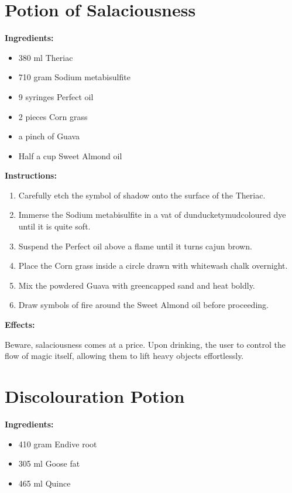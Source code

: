 \documentclass{article}
\begin{document}
\newpage
\section*{Potion of Salaciousness}

\textbf{Ingredients:}

\begin{itemize}
  \item 380 ml Theriac
  \item 710 gram Sodium metabisulfite
  \item 9 syringes Perfect oil
  \item 2 pieces Corn grass
  \item a pinch of Guava
  \item Half a cup Sweet Almond oil
\end{itemize}

\textbf{Instructions:}

\begin{enumerate}
  \item Carefully etch the symbol of shadow onto the surface of the Theriac.
  \item Immerse the Sodium metabisulfite in a vat of dunducketymudcoloured dye until it is quite soft.
  \item Suspend the Perfect oil above a flame until it turns cajun brown.
  \item Place the Corn grass inside a circle drawn with whitewash chalk overnight.
  \item Mix the powdered Guava with greencapped sand and heat boldly.
  \item Draw symbols of fire around the Sweet Almond oil before proceeding.
\end{enumerate}

\textbf{Effects:}

Beware, salaciousness comes at a price. Upon drinking, the user to control the flow of magic itself, allowing them to lift heavy objects effortlessly.

\newpage
\section*{Discolouration Potion}

\textbf{Ingredients:}

\begin{itemize}
  \item 410 gram Endive root
  \item 305 ml Goose fat
  \item 465 ml Quince
\end{itemize}
\end{document}
